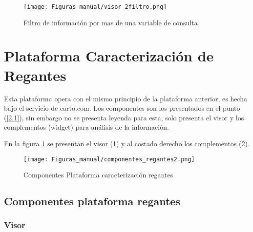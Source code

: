 \documentclass[10pt]{article}
\begin{document}
\begin{figure}[H]
\centering
\texttt{[image: Figuras\_manual/visor\_2filtro.png]}
\caption{Filtro de información por mas de una variable de consulta}
\end{figure}

\newpage

\section{Plataforma Caracterización de Regantes}

Esta plataforma opera con el mismo principio de la plataforma anterior, es hecha bajo el servicio de carto.com. Los componentes son los presentados en el punto (\ref{2.1}), sin embargo no se presenta leyenda para esta, solo presenta el visor y los complementos (widget) para análisis de la información.\bigskip\setlength{\parindent}{0pt}

En la figura \ref{9} se presentan el visor (1) y al costado derecho los complementos (2).

\begin{figure}[H]
\centering
\texttt{[image: Figuras\_manual/componentes\_regantes2.png]}
\caption{Componentes Plataforma caracterización regantes}
\label{9}
\end{figure}

\subsection{Componentes plataforma regantes}

\subsubsection{Visor}
\end{document}
